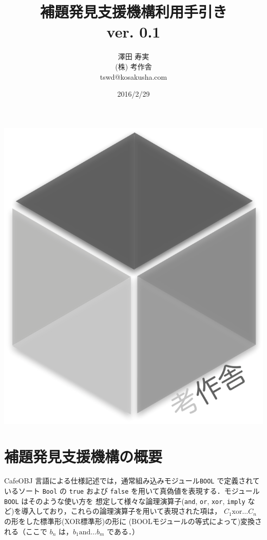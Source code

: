 \documentclass[a4paper,oneside,10pt,here]{memoir}
\begin{document}
\tightlists
\sloppy
\raggedbottom
{}
\frontmatter
\pagestyle{empty}
\title{補題発見支援機構利用手引き \\
ver. 0.1}
\vfill
\author{澤田 寿実\\
  (株) 考作舎\\
  tswd@kosakusha.com}
\date{2016/2/29}
\maketitle
\vfill
\begin{center}
\includegraphics[scale=0.2]{kosakusha2_gray.pdf}
\end{center}
\vfill
\thispagestyle{empty}
\newpage
\mainmatter
\pagestyle{plain}
\tableofcontents
\EnableBpAbbreviations
\newpage
\chapter{補題発見支援機構の概要}
CafeOBJ 言語による仕様記述では，通常組み込みモジュール\verb|BOOL|
で定義されているソート \verb|Bool| の \verb|true| および \verb|false|
を用いて真偽値を表現する．モジュール \verb|BOOL| はそのような使い方を
想定して様々な論理演算子(\verb|and|, \verb|or|, \verb|xor|, \verb|imply|
など)を導入しており，これらの論理演算子を用いて表現された項は，
$C_1 \mbox{xor} \ldots C_n$ の形をした標準形(XOR標準形)の形に
(BOOLモジュールの等式によって)変換される（ここで $b_n$ は，$b_1 \mbox{and}\ldots b_m$ である．）
\end{document}
